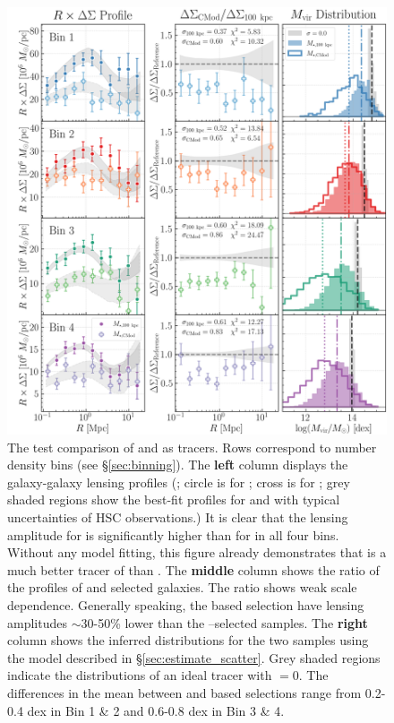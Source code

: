 \documentclass[fleqn,usenatbib,useAMS,english]{mnras}
\begin{document}
  \begin{figure}
      \centering
      \includegraphics[width=\textwidth]{figure/topn_fig_7}
      \caption{
          The \topn{} test comparison of  and \mcmodel{} as \mhalo{} tracers.
          Rows correspond to number density bins (see \S \ref{sec:binning}).
          The \textbf{left} column displays the galaxy-galaxy lensing profiles (\rdsigma{}; circle is
          for ; cross is for \mcmodel{}; grey shaded regions show the best-fit
          profiles for \maper{} and \mcmodel{} with typical uncertainties of HSC observations.)
          It is clear that the lensing amplitude for  is significantly higher than for
          \mcmodel{} in all four bins.
          Without any model fitting, this figure already demonstrates that  is a much
          better tracer of \mhalo{} than \mcmodel{}.
          The \textbf{middle} column shows the ratio of the \dsigma{} profiles of \mcmodel{} and 
          selected galaxies.
          The ratio shows weak scale dependence.
          Generally speaking, the \mcmodel{} based selection have lensing amplitudes $\sim$30-50\%
          lower than the --selected samples.
          The \textbf{right} column shows the inferred \mhalo{} distributions for the two samples using the
          model described in \S \ref{sec:estimate_scatter}.
          Grey shaded regions indicate the \mhalo{} distributions of an ideal tracer with
          \sigmh{}$=0$.
          The differences in the mean \mhalo{} between \mcmodel{} and \maper{} based selections
          range from 0.2-0.4 dex in Bin 1 \& 2 and 0.6-0.8 dex in Bin 3 \& 4.
          }
      \label{fig:m100_cmod}
  \end{figure}
\end{document}
